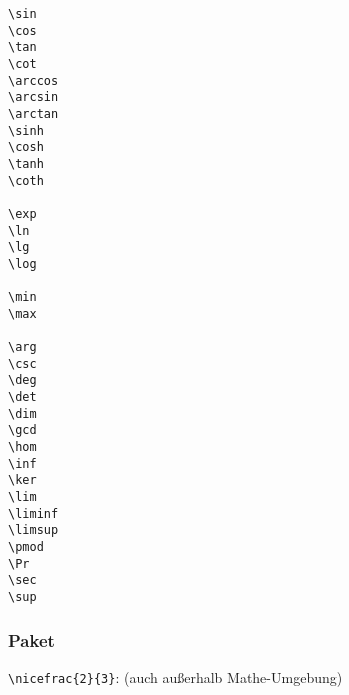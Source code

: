 
\setlength{\columnseprule}{0.5pt}


\begin{multicols}{4}
\begin{lstlisting}
\sin
\cos
\tan
\cot
\arccos
\arcsin
\arctan
\sinh
\cosh
\tanh
\coth

\exp
\ln
\lg
\log

\min
\max 

\arg
\csc
\deg 
\det 
\dim
\gcd
\hom
\inf
\ker
\lim
\liminf
\limsup
\pmod
\Pr
\sec
\sup 
\end{lstlisting}

\end{multicols}


\subsubsection*{Paket }
\lstinline|\nicefrac{2}{3}|: 
	\hspace{1em}  
	\hspace{1em} (auch außerhalb Mathe-Umgebung)

